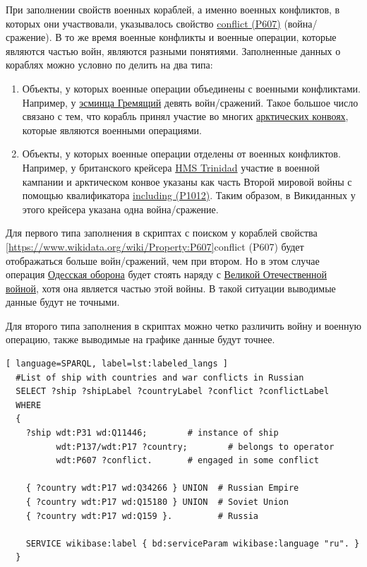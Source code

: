 При заполнении свойств военных кораблей, а именно военных конфликтов, в которых они участвовали, указывалось свойство \href{https://www.wikidata.org/wiki/Property:P607}{conflict (P607)} (война/сражение). В то же время военные конфликты и военные операции, которые являются частью войн, являются разными понятиями. Заполненные данных о кораблях можно условно по делить на два типа:

\begin{enumerate}
  \item Объекты, у которых военные операции объединены с военными конфликтами. Например, у \href{https://www.wikidata.org/wiki/Q4148613}{эсминца Гремящий} девять войн/сражений. Такое большое число связано с тем, что корабль принял участие во многих \href{https://ru.wikipedia.org/wiki/Арктические_конвои}{арктических конвоях}, которые являются военными операциями.
  \item Объекты, у которых военные операции отделены от военных конфликтов. Например, у британского крейсера \href{https://ru.wikipedia.org/wiki/HMS_Trinidad_(1940)}{HMS Trinidad} участие в военной кампании и арктическом конвое указаны как часть Второй мировой войны с помощью квалификатора \href{https://www.wikidata.org/wiki/Property:P1012}{including (P1012)}. Таким образом, в Викиданных у этого крейсера указана одна война/сражение.
\end{enumerate}

Для первого типа заполнения в скриптах с поиском у кораблей свойства \ref{https://www.wikidata.org/wiki/Property:P607}{conflict (P607)} будет отображаться больше войн/сражений, чем при втором. Но в этом случае операция \href{https://ru.wikipedia.org/wiki/Одесская_оборона_(1941)}{Одесская оборона} будет стоять наряду с \href{https://ru.wikipedia.org/wiki/Великая_Отечественная_война}{Великой Отечественной войной}, хотя она является частью этой войны. В такой ситуации выводимые данные будут не точными.

Для второго типа заполнения в скриптах можно четко различить войну и военную операцию, также выводимые на графике данные будут точнее.


\begin{lstlisting}[ language=SPARQL, label=lst:labeled_langs ]
  #List of ship with countries and war conflicts in Russian
  SELECT ?ship ?shipLabel ?countryLabel ?conflict ?conflictLabel
  WHERE
  {
    ?ship wdt:P31 wd:Q11446;        # instance of ship
          wdt:P137/wdt:P17 ?country;        # belongs to operator
          wdt:P607 ?conflict.       # engaged in some conflict
    
    { ?country wdt:P17 wd:Q34266 } UNION  # Russian Empire
    { ?country wdt:P17 wd:Q15180 } UNION  # Soviet Union
    { ?country wdt:P17 wd:Q159 }.         # Russia
    
    SERVICE wikibase:label { bd:serviceParam wikibase:language "ru". }
  }
\end{lstlisting}

